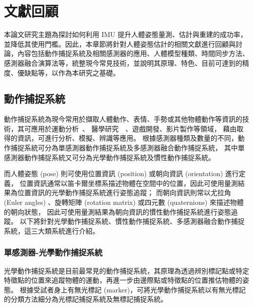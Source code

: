 \chapter{文獻回顧}
\fontsize{12pt}{18pt}\selectfont %

本論文研究主題為探討如何利用 IMU 提升人體姿態量測、估計與重建的成功率，並降低其使用門檻。因此，本章節將針對人體姿態估計的相關文獻進行回顧與討論，內容包括動作捕捉系統及相關感測器的應用、人體模型種類、時間同步方法、感測器融合演算法等，統整現今常見技術，並說明其原理、特色、目前可達到的精度、優缺點等，以作為本研究之基礎。

\section{動作捕捉系統}
動作捕捉系統為現今常用於擷取人體動作、表情、手勢或其他物體動作等資訊的技術，其可應用於運動分析~\cite{armitano2022swot}、
醫學研究~\cite{alarcon2020upper}~\cite{gu2023imu}、遊戲開發、影片製作等領域，
藉由取得的資訊，可進行分析、模擬、辨識等應用。
根據感測器種類及數量的不同，動作捕捉系統可分為單感測器動作捕捉系統及多感測器融合動作捕捉系統，
其中單感測器動作捕捉系統又可分為光學動作捕捉系統及慣性動作捕捉系統。 

而人體姿態 (pose) 則可使用位置資訊 (position) 或朝向資訊 (orientation) 進行定義，
位置資訊通常以笛卡爾坐標系描述物體在空間中的位置，因此可使用量測結果為位置資訊的光學動作捕捉系統進行姿態追蹤；
而朝向資訊則常以尤拉角 (Euler angles) 、旋轉矩陣 (rotation matrix) 或四元數 (quaternions) 來描述物體的朝向狀態，
因此可使用量測結果為朝向資訊的慣性動作捕捉系統進行姿態追蹤。
以下將針對光學動作捕捉系統、慣性動作捕捉系統、多感測器融合動作捕捉系統，這三大類系統進行介紹。

\subsection{單感測器-光學動作捕捉系統}
光學動作捕捉系統是目前最常見的動作捕捉系統，其原理為透過辨別標記點或特定特徵點的位置來追蹤物體的運動，再進一步由邊際點或特徵點的位置推估物體的姿態。
根據受試者身上有無光標記 (marker)，可將光學動作捕捉系統以有無光標記的分類方法細分為光標記捕捉系統及無標記捕捉系統。


